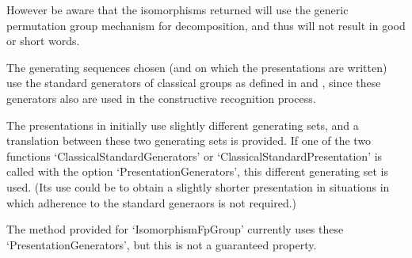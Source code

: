 However be aware that the isomorphisms returned will use the generic
permutation group mechanism for decomposition, and thus will not result in
good or short words.


The generating sequences chosen (and on which the presentations are written)
use the standard generators of classical groups as defined in
\cite{LGO09} and \cite{DLLGO13}, since these generators also are used in the
constructive recognition process.

The presentations in \cite{LGO20} initially use slightly different generating
sets, and a translation between these two generating sets is provided. If one
of the two functions `ClassicalStandardGenerators' or
`ClassicalStandardPresentation' is called with the option
`PresentationGenerators', this different generating set is used. (Its use
could be to obtain a slightly shorter presentation in situations in which
adherence to the standard generaors is not required.)

The method provided for `IsomorphismFpGroup' currently uses these
`PresentationGenerators', but this is not a guaranteed property.


